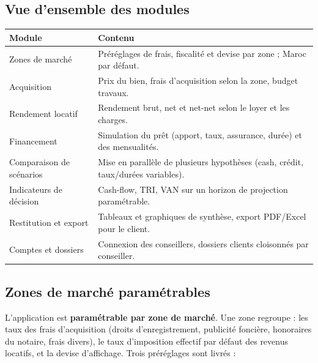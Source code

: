 \documentclass[11pt,a4paper]{article}
\begin{document}
	\subsection{Vue d'ensemble des modules}

	\begin{table}[H]
		\centering
		\small
		\renewcommand{\arraystretch}{1.40}
		\begin{tabular}{|>{\raggedright\arraybackslash}p{4.5cm}|>{\raggedright\arraybackslash}p{10.5cm}|}
			\hline
			\rowcolor{eccblue!15}
			\textbf{\color{eccblue}Module} & \textbf{\color{eccblue}Contenu} \\
			\hline
			\rowcolor{white}
			Zones de marché & Préréglages de frais, fiscalité et devise par zone ; Maroc par défaut. \\
			\rowcolor{gray!8}
			Acquisition & Prix du bien, frais d'acquisition selon la zone, budget travaux. \\
			\rowcolor{white}
			Rendement locatif & Rendement brut, net et net-net selon le loyer et les charges. \\
			\rowcolor{gray!8}
			Financement & Simulation du prêt (apport, taux, assurance, durée) et des mensualités. \\
			\rowcolor{white}
			Comparaison de scénarios & Mise en parallèle de plusieurs hypothèses (cash, crédit, taux/durées variables). \\
			\rowcolor{gray!8}
			Indicateurs de décision & Cash-flow, TRI, VAN sur un horizon de projection paramétrable. \\
			\rowcolor{white}
			Restitution et export & Tableaux et graphiques de synthèse, export PDF/Excel pour le client. \\
			\rowcolor{gray!8}
			Comptes et dossiers & Connexion des conseillers, dossiers clients cloisonnés par conseiller. \\
			\hline
		\end{tabular}
	\end{table}

	\subsection{Zones de marché paramétrables}
	L'application est \textbf{paramétrable par zone de marché}. Une zone regroupe : les taux des frais d'acquisition (droits d'enregistrement, publicité foncière, honoraires du notaire, frais divers), le taux d'imposition effectif par défaut des revenus locatifs, et la devise d'affichage. Trois préréglages sont livrés :
\end{document}
